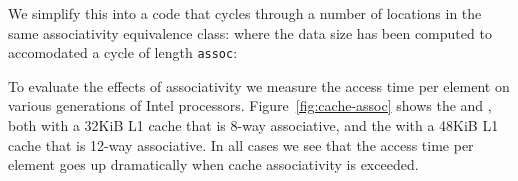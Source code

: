 We simplify this into a code that cycles through a number of locations
in the same associativity equivalence class:
where the data size has been computed to accomodated
a cycle of length \lstinline{assoc}:

To evaluate the effects of associativity we measure the access time per element
on various generations of Intel processors.
Figure~\ref{fig:cache-assoc} shows the
 and ,
both with a 32KiB L1 cache that is 8-way associative,
and the  
with a 48KiB L1 cache that is 12-way associative.
In all cases we see that the access time per element
goes up dramatically when cache associativity is exceeded.


